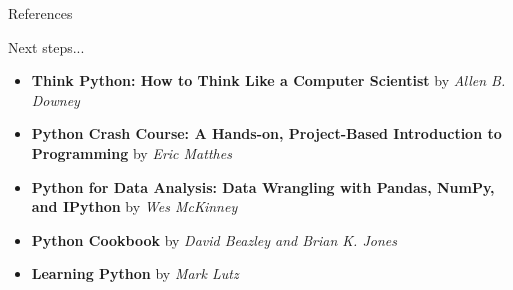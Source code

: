 \begin{frame}{References}\vspace{10pt}
\flushleft

Next steps...

\begin{itemize}
\item 
  \textbf{Think Python: How to Think Like a Computer Scientist} by \textsl{Allen B. Downey} 

\item
  \textbf{Python Crash Course: A Hands-on, Project-Based Introduction to Programming} by \textsl{Eric Matthes}

\item
  \textbf{Python for Data Analysis: Data Wrangling with Pandas, NumPy, and IPython} by \textsl{Wes McKinney}

\item
  \textbf{Python Cookbook} by \textsl{David Beazley and Brian K. Jones}

\item
  \textbf{Learning Python} by \textsl{Mark Lutz}

\end{itemize}
\end{frame}
